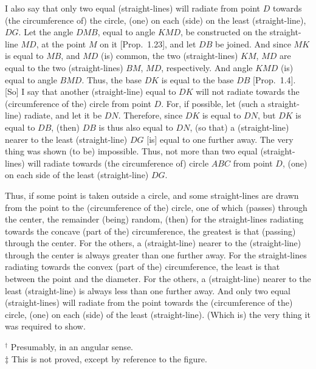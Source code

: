 \begin{Parallel}{}{}
{I also say that only two equal (straight-lines) will radiate from point $D$ towards (the
circumference of) the circle, (one) on each (side) on the least (straight-line),
$DG$. Let the  angle $DMB$, equal to angle $KMD$, be constructed
on the straight-line $MD$, at the point $M$ on it [Prop.~1.23], and  let $DB$ be
joined. And since $MK$ is equal to $MB$, and $MD$ (is) common, the
two (straight-lines) $KM$, $MD$ are equal to the two (straight-lines) $BM$, $MD$,
respectively. And angle $KMD$ (is) equal to angle $BMD$. Thus, the base
$DK$ is equal to the base $DB$ [Prop.~1.4]. [So] I say that another (straight-line)
equal to $DK$ will not radiate towards the (circumference of the) circle
from point $D$. For, if possible, let (such a straight-line) radiate, and let
it be $DN$. Therefore, since $DK$ is equal to $DN$, but $DK$ is equal to $DB$, (then) $DB$
is thus also equal to $DN$, (so that) a (straight-line) nearer to the least (straight-line) $DG$ [is]
equal to one further away. The very thing was shown (to be)  impossible. 
Thus, not more than two equal (straight-lines) will radiate towards
(the circumference of) circle $ABC$ from point $D$, (one) on each side
of the least (straight-line) $DG$.

Thus, if some point is taken outside a circle, and some straight-lines are
drawn from the point to the (circumference of the) circle, one of which (passes) through the
center, the remainder  (being) random, (then) for the straight-lines
radiating towards the concave (part of the) circumference, the
greatest is  that (passing) through the center. For the others, a (straight-line)
nearer to the (straight-line) through the center is always greater than one
further away. For the straight-lines radiating towards the convex (part of
the) circumference, the least is that between the point and the
diameter. For the others, a (straight-line) nearer to the least
(straight-line) is always less than one further away. And only
two equal (straight-lines) will radiate from the point towards the (circumference of the) circle, (one) on each (side)
of the least (straight-line).  (Which is) the very thing it was required to show.}
\end{Parallel}
{\footnotesize \noindent$^\dag$ Presumably, in an angular sense.\\
$\ddag$  This is not
proved, except by reference to the figure.} 

